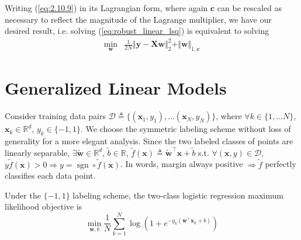\documentclass{article}
\numberwithin{equation}{section}
\begin{document}
Writing (\ref{eq:2.10.9}) in its Lagrangian form, where again $ \mathbf{c} $
can be rescaled as necessary to reflect the magnitude of the Lagrange
multiplier, we have our desired result, i.e. solving
(\ref{eq:robust_linear_lsq}) is equivalent to solving
\begin{equation}
    \begin{array}{rl}
        \displaystyle\min_\mathbf{w} &
        \frac{1}{2N}\Vert\mathbf{y} - \mathbf{Xw}\Vert_2^2 +
        \Vert\mathbf{w}\Vert_{1, \mathbf{c}}
    \end{array}
\end{equation}

\section{Generalized Linear Models}



\medskip

Consider training data pairs $ \mathcal{D} \triangleq
\{(\mathbf{x}_1, y_1), \ldots (\mathbf{x}_N, y_N)\} $, where $ \forall k \in
\{1, \ldots N\} $, $ \mathbf{x}_k \in \mathbb{R}^d $, $ y_k \in \{-1, 1\} $.
We choose the symmetric labeling scheme without loss of generality for a more
elegant analysis. Since the two labeled classes of points are linearly
separable, $ \exists \tilde{\mathbf{w}} \in \mathbb{R}^d $,
$ \tilde{b} \in \mathbb{R} $, $ \tilde{f}(\mathbf{x}) \triangleq
\tilde{\mathbf{w}}^\top\mathbf{x} + \tilde{b} $ s.t.
$ \forall (\mathbf{x}, y) \in \mathcal{D} $, $ y\tilde{f}(\mathbf{x}) > 0
\Rightarrow y = \operatorname{sgn} \circ \tilde{f}(\mathbf{x}) $. In words,
margin always positive $ \Rightarrow \tilde{f} $ perfectly classifies
each data point.

\medskip

Under the $ \{-1, 1\} $ labeling scheme, the two-class logistic regression
maximum likelihood objective is
\begin{equation} \label{eq:logreg_binary_mle}
    \min_{\mathbf{w}, b}\frac{1}{N}\sum_{k = 1}^N\log\left(
        1 + e^{-y_k\left(\mathbf{w}^\top\mathbf{x}_k + b\right)}
    \right)
\end{equation}
\end{document}
